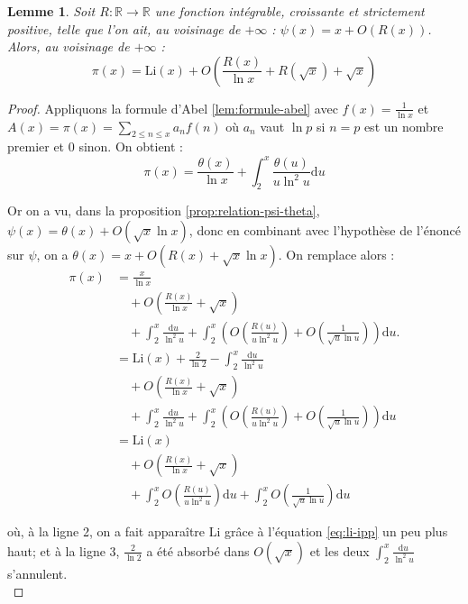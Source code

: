 \documentclass[french]{report}
\newtheorem{lemma}[theorem]{Lemme}
\begin{document}
\begin{lemma}\label{lem:psi-x-r}
  Soit $R:\mathbb{R}\to\mathbb{R}$ une fonction intégrable, croissante et strictement positive, telle que l'on ait, au voisinage de $+\infty$ : $\psi(x)=x+O(R(x))$. Alors, au voisinage de $+\infty$ :
  \[
    \pi(x)
    = \mathrm{Li}(x)
    + O\left(\frac{R(x)}{\ln x} + R(\sqrt{x}) + \sqrt{x}\right)
  \]
\end{lemma}

\begin{proof}
  Appliquons la formule d'Abel \ref{lem:formule-abel} avec $f(x)=\frac{1}{\ln x}$ et $A(x)=\pi(x)=\sum_{2\leq n\leq x}a_nf(n)$ où $a_n$ vaut $\ln p$ si $n=p$ est un nombre premier et 0 sinon. On obtient :
  \[
    \pi(x)
    = \frac{\theta(x)}{\ln x}
    + \int_2^x{\frac{\theta(u)}{u\ln^2u}}\mathrm{d}u
  \]

  Or on a vu, dans la proposition \ref{prop:relation-psi-theta}, $\psi(x) = \theta(x)+O(\sqrt{x}\ln x)$, donc en combinant avec l'hypothèse de l'énoncé sur $\psi$, on a $\theta(x) = x + O(R(x)+\sqrt{x}\ln x)$. On remplace alors :
  \begin{align*}
    \pi(x)
    &= \frac{x}{\ln x} \\
    &\quad + O\left(\frac{R(x)}{\ln x} + \sqrt{x}\right) \\
    &\quad + \int_2^x\frac{\mathrm{d}u}{\ln^2 u}
    + \int_2^x\left( O\left(\frac{R(u)}{u\ln^2 u}\right) + O\left(\frac{1}{\sqrt{u}\ln u}\right) \right)\mathrm{d}u. \\
    &= \mathrm{Li}(x) + \frac{2}{\ln2} - \int_2^x{\frac{\mathrm{d}u}{\ln^2 u}}\\
    &\quad + O\left(\frac{R(x)}{\ln x} + \sqrt{x}\right) \\
    &\quad + \int_2^x\frac{\mathrm{d}u}{\ln^2 u}
    + \int_2^x\left( O\left(\frac{R(u)}{u\ln^2 u}\right) + O\left(\frac{1}{\sqrt{u}\ln u}\right) \right)\mathrm{d}u \\
    &= \mathrm{Li}(x) \\
    &\quad + O\left(\frac{R(x)}{\ln x} + \sqrt{x}\right) \\
    &\quad + \int_2^x O\left(\frac{R(u)}{u\ln^2 u}\right)\mathrm{d}u
    + \int_2^xO\left(\frac{1}{\sqrt{u}\ln u}\right)\mathrm{d}u
  \end{align*}

  où, à la ligne 2, on a fait apparaître $\mathrm{Li}$ grâce à l'équation \ref{eq:li-ipp} un peu plus haut; et à la ligne 3, $\frac{2}{\ln2}$ a été absorbé dans $O(\sqrt{x})$ et les deux $\int_2^x\frac{\mathrm{d}u}{\ln^2 u}$ s'annulent.
  \\


\end{proof}
\end{document}
